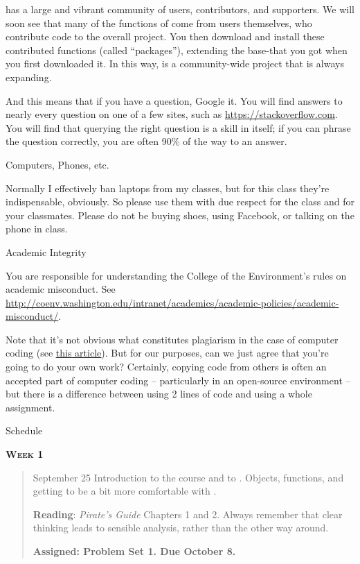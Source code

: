 \documentclass[11pt,letterpaper]{article}
\begin{document}
\R has a large and vibrant community of users, contributors, and supporters. We will soon see that many of the functions of \R come from users themselves, who contribute code to the overall project. You then download and install these contributed functions (called ``packages''), extending the base-\R that you got when you first downloaded it. In this way, \R is a community-wide project that is always expanding. 

And this means that if you have a question, Google it.  You will find answers to nearly every question on one of a few sites, such as \url{https://stackoverflow.com}. You will find that querying the right question is a skill in itself; if you can phrase the question correctly, you are often 90\% of the way to an answer.

{\Large Computers, Phones, etc.}\hrulefill

Normally I effectively ban laptops from my classes, but for this class they're indispensable, obviously. So please use them with due respect for the class and for your classmates. Please do not be buying shoes, using Facebook, or talking on the phone in class.

{\Large Academic Integrity}\hrulefill

You are responsible for understanding the College of the Environment's
rules on academic misconduct. See
\url{http://coenv.washington.edu/intranet/academics/academic-policies/academic-misconduct/}.

Note that it's not obvious what constitutes plagiarism in the case of computer coding (see \href{https://www.nytimes.com/2017/05/29/us/computer-science-cheating.html}{\underline{this article}}). But for our purposes, can we just agree that you're going to do your own work? Certainly, copying code from others is often an accepted part of computer coding -- particularly in an open-source environment -- but there is a difference between using 2 lines of code and using a whole assignment.
\pagebreak

\huge Schedule
\hrulefill

\normalsize


\textbf{\textsc{Week 1}}
		\begin{quote}	
		September 25 \textbullet \space Introduction to the course and to \R. Objects, functions, and getting to be a bit more comfortable with \R.
		
		\textbf{Reading}: \textit{Pirate's Guide} Chapters 1 and 2. 
		Always remember that clear thinking leads to sensible analysis, rather than the other way around.
		
		\textbf{Assigned: Problem Set 1.  Due October 8.}
		
		\end{quote}
\end{document}

